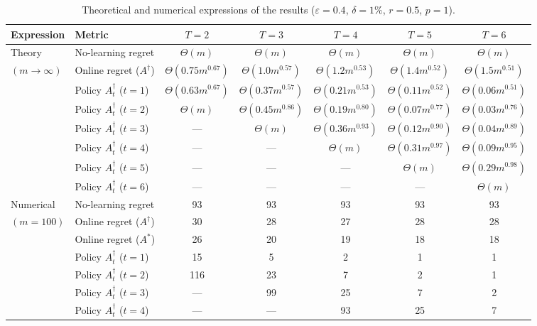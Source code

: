 \documentclass[11pt]{article}
\renewcommand{\arraystretch}{1.5}
\begin{document}
\begin{table}[h!]
\centering
\footnotesize\renewcommand{\arraystretch}{1.0}
\caption{Theoretical and numerical expressions of the results ($\varepsilon=0.4$, $\delta=1\%$, $r=0.5$, $p=1$).}
\label{tab:main_R1}
\begin{tabular}{llccccc}
\toprule
Expression	&	Metric			&	$T=2$						&	$T=3$						&	$T=4	$						&	$T=5$						&	$T=6$						\\
\hline
Theory		&	No-learning regret	&	$\Theta(m)$			&	$\Theta(m)$			&	$\Theta(m)$			&	$\Theta(m)$			&	$\Theta(m)$			\\
$(m\to\infty)$	&	Online regret ($A^\dagger$)		&	$\Theta(0.75m^{0.67})$	&	$\Theta(1.0m^{0.57})$	&	$\Theta(1.2m^{0.53})$	&	$\Theta(1.4m^{0.52})$	&	$\Theta(1.5m^{0.51})$	\\
\cmidrule{2-7}
			&	Policy $A^\dagger_t$ ($t=1$)	&	$\Theta(0.63 m^{0.67})$	&	$\Theta(0.37 m^{0.57})$	&	$\Theta(0.21 m^{0.53})$	&	$\Theta(0.11 m^{0.52})$	&	$\Theta(0.06 m^{0.51})$	\\
			&	Policy $A^\dagger_t$ ($t=2$)	&	$\Theta(m)$					&	$\Theta(0.45 m^{0.86})$	&	$\Theta(0.19 m^{0.80})$	&	$\Theta(0.07 m^{0.77})$	&	$\Theta(0.03 m^{0.76})$	\\
			&	Policy $A^\dagger_t$ ($t=3$)	&	---							&	$\Theta(m)$					&	$\Theta(0.36 m^{0.93})$	&	$\Theta(0.12 m^{0.90})$	&	$\Theta(0.04 m^{0.89})$	\\
			&	Policy $A^\dagger_t$ ($t=4$)	&	---							&	---							&	$\Theta(m)$					&	$\Theta(0.31 m^{0.97})$	&	$\Theta(0.09 m^{0.95})$	\\
			&	Policy $A^\dagger_t$ ($t=5$)	&	---							&	---							&	---							&	$\Theta(m)$					&	$\Theta(0.29 m^{0.98})$	\\
			&	Policy $A^\dagger_t$ ($t=6$)	&	---							&	---							&	---							&	---							&	$\Theta(m)$					\\
\hline
Numerical	&	No-learning regret	&	93		&	93		&	93		&	93		&	93		\\
$(m=100)$	&	Online regret ($A^\dagger$)		&	30		&	28		&	27		&	28		&	28		\\
	        &	Online regret ($A^*$)		&	26		&	20		&	19		&	18		&	18		\\
\cmidrule{2-7}
			&	Policy $A^\dagger_t$ ($t=1$)	&	15		&	5		&	2		&	1		&	1		\\
			&	Policy $A^\dagger_t$ ($t=2$)	&	116		&	23		&	7		&	2		&	1		\\
			&	Policy $A^\dagger_t$ ($t=3$)	&	---		&	99		&	25		&	7		&	2		\\
			&	Policy $A^\dagger_t$ ($t=4$)	&	---		&	---		&	93		&	25		&	7		\\

\end{tabular}
\end{table}
\end{document}
